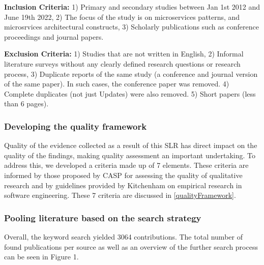 \documentclass[conference]{IEEEtran}
\begin{document}
\textbf{Inclusion Criteria:} 1) Primary and secondary studies between Jan 1st 2012 and June 19th 2022, 2) The focus of the study is on microservices patterns, and microsrvices architectural constructs, 3) Scholarly publications such as conference proceedings and journal papers.

\textbf{Exclusion Criteria:} 1) Studies that are not written in English, 2) Informal literature surveys without any clearly defined research questions or research process, 3) Duplicate reports of the same study (a conference and journal version of the same paper). In such cases, the conference paper was removed. 4) Complete duplicates (not just Updates) were also removed. 5) Short papers (less than 6 pages).

\subsubsection{Developing the quality framework}

Quality of the evidence collected as a result of this SLR has direct impact on the quality of the findings, making quality assessment an important undertaking. To address this, we developed a criteria made up of 7 elements. These criteria are informed by those proposed by CASP for assessing the quality of qualitative research \cite{CASP} and by guidelines provided by Kitchenham \cite{kitchenham2002preliminary} on empirical research in software engineering. These 7 criteria are discussed in \ref{qualityFramework}.


\subsubsection{Pooling literature based on the search strategy}
Overall, the keyword search yielded 3064 contributions. The total number of found publications per source as well as an overview of the further search process can be seen in Figure 1.
\end{document}
